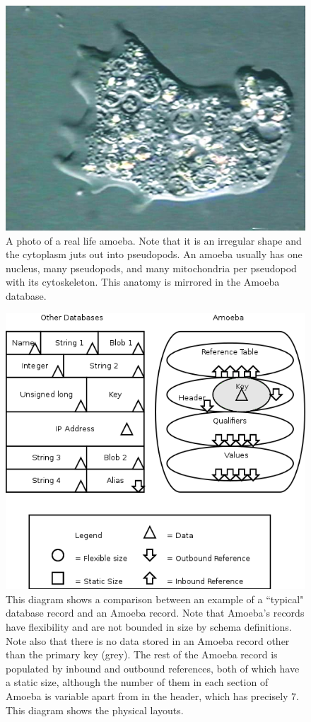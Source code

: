 \documentclass[11pt]{article}
\begin{document}
\begin{figure}[ht]
\centering
\includegraphics[scale=0.3]{amoeba.jpg}
\caption{A photo of a real life amoeba. Note that it is an irregular shape and the cytoplasm juts out into pseudopods. An amoeba usually has one nucleus, many pseudopods, and many mitochondria per pseudopod with its  cytoskeleton. This anatomy is mirrored in the Amoeba database.}
\end{figure}
\newpage
\noindent
\begin{figure}
\caption{This diagram shows a comparison between an example of a ``typical" database record and an Amoeba record. Note that Amoeba's records have flexibility and are not bounded in size by schema definitions. Note also that there is no data stored in an Amoeba record other than the primary key (grey). The rest of the Amoeba record is populated by inbound and outbound references, both of which have a static size, although the number of them in each section of Amoeba is variable apart from in the header, which has precisely 7. This diagram shows the physical layouts.}
  \includegraphics[scale=0.5]{AmoebaRecordStructure.png}
\end{figure}
\end{document}
